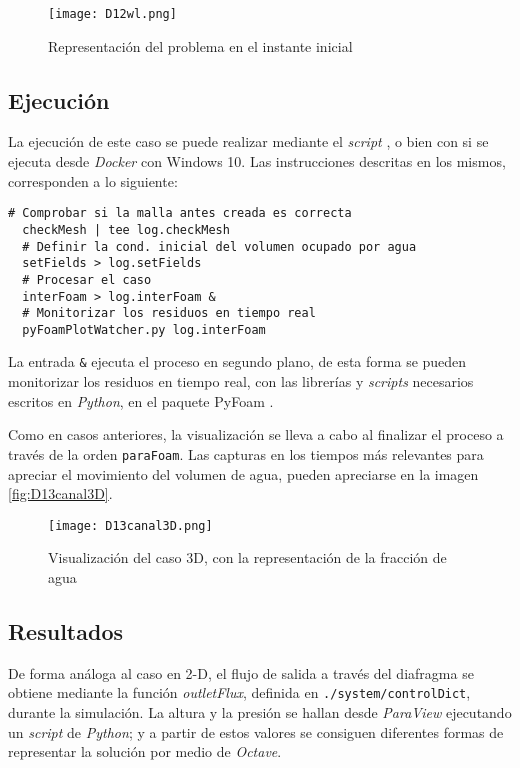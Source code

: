 \begin{figure}
\centering
\texttt{[image: D12wl.png]}
\caption{Representación del problema en el instante inicial}
\label{fig:D12wl}
\end{figure}

\subsection{Ejecución}\label{header-n149}

La ejecución de este caso se puede realizar mediante el \emph{script} ,
o bien con si se ejecuta desde \emph{Docker} con Windows 10. Las
instrucciones descritas en los mismos, corresponden a lo siguiente:

\begin{lstlisting}[style=bash]
  # Comprobar si la malla antes creada es correcta
  checkMesh | tee log.checkMesh
  # Definir la cond. inicial del volumen ocupado por agua
  setFields > log.setFields
  # Procesar el caso
  interFoam > log.interFoam &
  # Monitorizar los residuos en tiempo real
  pyFoamPlotWatcher.py log.interFoam
\end{lstlisting}

La entrada \texttt{\&} ejecuta el proceso en segundo plano, de esta
forma se pueden monitorizar los residuos en tiempo real, con las
librerías y \emph{scripts} necesarios escritos en \emph{Python}, en el paquete PyFoam \cite{pyfoam}.

Como en casos anteriores, la visualización se lleva a cabo al finalizar el proceso a través de la orden \lstinline[style=bash]{paraFoam}.
Las capturas en los tiempos más relevantes para apreciar el movimiento del volumen de agua, pueden apreciarse en la imagen \autoref{fig:D13canal3D}. 

\begin{figure}[hb]
\centering
\texttt{[image: D13canal3D.png]}
\caption[Visualización del caso 3D]{Visualización del caso 3D, con la representación de la fracción de agua}
\label{fig:D13canal3D}
\end{figure}

\subsection{Resultados}\label{header-n176}

De forma análoga al caso en 2-D, el flujo de salida a través del
diafragma se obtiene mediante la función \emph{outletFlux}, definida en
\lstinline[style=bash]{./system/controlDict}, durante la simulación. La
altura y la presión se hallan desde \emph{ParaView} ejecutando un
\emph{script} de \emph{Python}; y a partir de estos valores se consiguen
diferentes formas de representar la solución por medio de \emph{Octave}.

